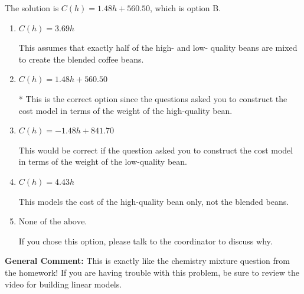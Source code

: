 \documentclass{extbook}[14pt]
\begin{document}
\begin{enumerate}
{The solution is \( C(h) = 1.48 h + 560.50 \), which is option B.\begin{enumerate}[label=\Alph*.]
\item \( C(h) = 3.69 h \)

This assumes that exactly half of the high- and low- quality beans are mixed to create the blended coffee beans.
\item \( C(h) = 1.48 h + 560.50 \)

* This is the correct option since the questions asked you to construct the cost model in terms of the weight of the high-quality bean.
\item \( C(h) = -1.48 h + 841.70 \)

This would be correct if the question asked you to construct the cost model in terms of the weight of the low-quality bean.
\item \( C(h) = 4.43 h \)

This models the cost of the high-quality bean only, not the blended beans.
\item \( \text{None of the above.} \)

If you chose this option, please talk to the coordinator to discuss why.
\end{enumerate}

\textbf{General Comment:} This is exactly like the chemistry mixture question from the homework! If you are having trouble with this problem, be sure to review the video for building linear models.
}
\end{enumerate}
\end{document}
